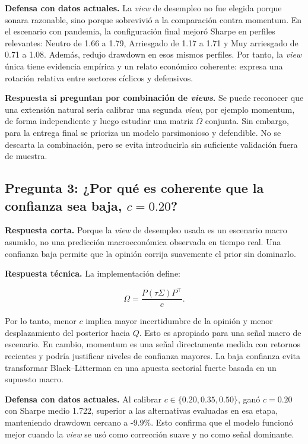 \documentclass[11pt]{article}
\begin{document}
\textbf{Defensa con datos actuales.} La \textit{view} de desempleo no fue elegida porque sonara razonable, sino porque sobrevivi\'o a la comparaci\'on contra momentum. En el escenario con pandemia, la configuraci\'on final mejor\'o Sharpe en perfiles relevantes: Neutro de 1.66 a 1.79, Arriesgado de 1.17 a 1.71 y Muy arriesgado de 0.71 a 1.08. Adem\'as, redujo drawdown en esos mismos perfiles. Por tanto, la \textit{view} \'unica tiene evidencia emp\'irica y un relato econ\'omico coherente: expresa una rotaci\'on relativa entre sectores c\'iclicos y defensivos.

\textbf{Respuesta si preguntan por combinaci\'on de \textit{views}.} Se puede reconocer que una extensi\'on natural ser\'ia calibrar una segunda \textit{view}, por ejemplo momentum, de forma independiente y luego estudiar una matriz $\Omega$ conjunta. Sin embargo, para la entrega final se prioriza un modelo parsimonioso y defendible. No se descarta la combinaci\'on, pero se evita introducirla sin suficiente validaci\'on fuera de muestra.

\subsection{\texorpdfstring{Pregunta 3: ¿Por qué es coherente que la confianza sea baja, $c=0.20$?}{Pregunta 3: ¿Por qué es coherente que la confianza sea baja, c=0.20?}}

\textbf{Respuesta corta.} Porque la \textit{view} de desempleo usada es un escenario macro asumido, no una predicci\'on macroecon\'omica observada en tiempo real. Una confianza baja permite que la opini\'on corrija suavemente el prior sin dominarlo.

\textbf{Respuesta t\'ecnica.} La implementaci\'on define:

\[
\Omega = \frac{P(\tau \Sigma)P^\top}{c}.
\]

Por lo tanto, menor $c$ implica mayor incertidumbre de la opini\'on y menor desplazamiento del posterior hacia $Q$. Esto es apropiado para una se\~nal macro de escenario. En cambio, momentum es una se\~nal directamente medida con retornos recientes y podr\'ia justificar niveles de confianza mayores. La baja confianza evita transformar Black--Litterman en una apuesta sectorial fuerte basada en un supuesto macro.

\textbf{Defensa con datos actuales.} Al calibrar $c \in \{0.20,0.35,0.50\}$, gan\'o $c=0.20$ con Sharpe medio 1.722, superior a las alternativas evaluadas en esa etapa, manteniendo drawdown cercano a -9.9\%. Esto confirma que el modelo funcion\'o mejor cuando la \textit{view} se us\'o como correcci\'on suave y no como se\~nal dominante.
\end{document}
